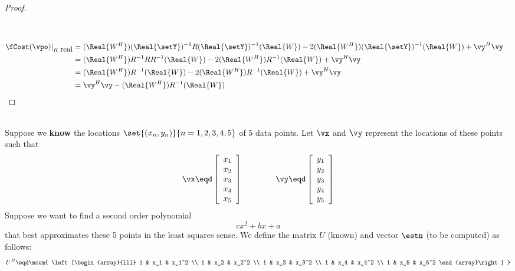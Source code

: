 \begin{proof}
\begin{align*}
\\
\\
   \fCost(\vpo)|_{R\mbox{ real}}
     &=    (\Real{W^H})(\Real{\setY})^{-1} R (\Real{\setY})^{-1}(\Real{W}) - 2(\Real{W^H})(\Real{\setY})^{-1}(\Real{W}) + \vy^H\vy
   \\&=    (\Real{W^H})R^{-1} R R^{-1}(\Real{W}) - 2(\Real{W^H})R^{-1}(\Real{W}) + \vy^H\vy
   \\&=    (\Real{W^H}) R^{-1}(\Real{W}) - 2(\Real{W^H})R^{-1}(\Real{W}) + \vy^H\vy
   \\&=    \vy^H\vy - (\Real{W^H})R^{-1}(\Real{W})
\end{align*}
\end{proof}


\begin{example}
\mbox{}\\
Suppose we {\bf know} the locations
$\set{(x_n,y_n)}{n=1,2,3,4,5}$ of 5 data points.
Let $\vx$ and $\vy$ represent the locations of these points such that
\[
   \vx \eqd
   \left[\begin{array}{l}
      x_1  \\
      x_2  \\
      x_3  \\
      x_4  \\
      x_5
   \end{array}\right]
   \qquad\qquad
   \vy \eqd
   \left[\begin{array}{l}
      y_1  \\
      y_2  \\
      y_3  \\
      y_4  \\
      y_5
   \end{array}\right]
\]
Suppose we want to find a second order polynomial
  \[ c x^2 + bx + a \]
that best approximates
these 5 points in the least squares sense.
We define the matrix $U$ (known) and vector $\estn$ (to be computed)
as follows:
\[
   U^H \eqd
   \mcom{
   \left[\begin{array}{lll}
      1  & x_1 & x_1^2  \\
      1  & x_2 & x_2^2  \\
      1  & x_3 & x_3^2  \\
      1  & x_4 & x_4^2  \\
      1  & x_5 & x_5^2
   \end{array}\right]
}\]
\end{example}
